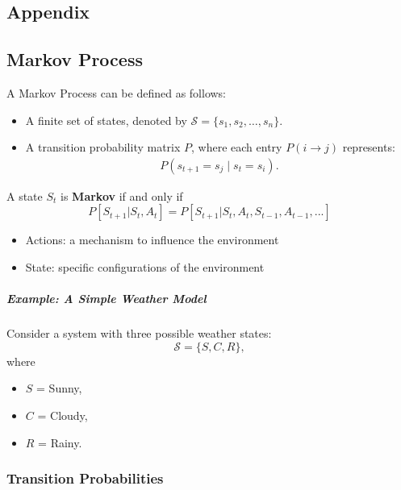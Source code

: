 \renewcommand{\thesection}{\Alph{section}.\arabic{section}}
\setcounter{section}{0}

\begin{appendices}
\chapter{Appendix}

\section{Markov Process}
\label{appendix:markov_process}
A Markov Process can be defined as follows:
\begin{itemize}
  \item A finite set of states, denoted by \( \mathcal{S} = \{ s_1, s_2, \dots, s_n \} \).
  \item A transition probability matrix \( P \), where each entry \( P(i \to j) \) represents:
	  \begin{align*}
			P(s_{t+1} = s_j \mid s_t = s_i).
	  \end{align*}
\end{itemize}

\begin{definition}
	A state $S_t$ is \textbf{Markov} if and only if 
	$$P[S_{t+1}|S_t, A_t] = P[S_{t+1}|S_t, A_t, S_{t-1},A_{t-1},...]$$
\end{definition}
\begin{itemize}
	\item Actions: a mechanism to influence the environment
	\item State: specific configurations of the environment
\end{itemize}


\paragraph{Example: A Simple Weather Model}

Consider a system with three possible weather states:
\[
\mathcal{S} = \{ S, C, R \},
\]
where
\begin{itemize}
  \item \(S\) = Sunny,
  \item \(C\) = Cloudy,
  \item \(R\) = Rainy.
\end{itemize}

\subsection{Transition Probabilities}


\end{appendices}
